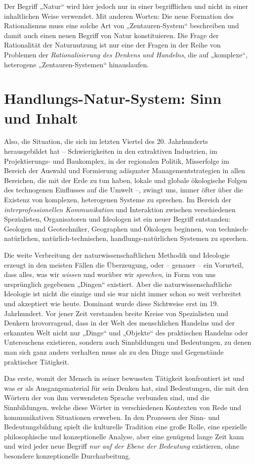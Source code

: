 \documentclass[11pt,a4paper]{article}
\begin{document}
Der Begriff „Natur“ wird hier jedoch nur in einer begriff\-lichen und nicht in
einer inhaltlichen Weise verwendet. Mit anderen Worten: Die neue Formation des
Rationalismus muss eine solche Art von „Zentauren-System“ beschreiben und
damit auch einen neuen Begriff von Natur konstituieren. Die Frage der
Rationalität der Naturnutzung ist nur eine der Fragen in der Reihe von
Problemen der \emph{Rationalisierung des Denkens und Handelns}, die auf
„komplexe“, heterogene „Zentauren-Systemen“ hinauslaufen.

\section{Handlungs-Natur-System: Sinn und Inhalt}

Also, die Situation, die sich im letzten Viertel des 20. Jahrhunderts
herausgebildet hat -- Schwierigkeiten in den extraktiven Industrien, im
Projektierungs- und Baukomplex, in der regionalen Politik, Misserfolge im
Bereich der Auswahl und Formierung adäquater Managementstrategien in allen
Bereichen, die mit der Erde zu tun haben, lokale und globale ökologische
Folgen des technogenen Einflusses auf die Umwelt --, zwingt uns, immer öfter
über die Existenz von komplexen, heterogenen Systeme zu sprechen.  Im Bereich
der \emph{interprofessionellen Kommunikation} und Interaktion zwischen
verschiedenen Spezialisten, Organisatoren und Ideologen ist ein neuer Begriff
entstanden: Geologen und Geotechniker, Geographen und Ökologen beginnen, von
technisch-natürlichen, natürlich-technischen, handlungs-natürlichen Systemen
zu sprechen.

Die weite Verbreitung der naturwissenschaftlichen Methodik und Ideologie
erzeugt in den meisten Fällen die Überzeugung, oder -- genauer -- ein
Vorurteil, dass alles, was wir \emph{wissen} und worüber wir \emph{sprechen},
in Form von uns ursprünglich gegebenen „Dingen“ existiert.  Aber die
naturwissenschaftliche Ideologie ist nicht die einzige und sie war nicht immer
schon so weit verbreitet und akzeptiert wie heute. Dominant wurde diese
Sichtweise erst im 19. Jahrhundert. Vor jener Zeit verstanden breite Kreise
von Spezialisten und Denkern hrovorragend, dass in der Welt des menschlichen
Handelns und der erkannten Welt nicht nur „Dinge“ und „Objekte“ des
praktischen Handelns oder Untersuchens existieren, sondern auch Sinnbildungen
und Bedeutungen, zu denen man sich ganz anders verhalten muss als zu den Dinge
und Gegenstände praktischer Tätigkeit.

Das erste, womit der Mensch in seiner bewussten Tätigkeit konfrontiert ist und
was er als Ausgangsmaterial für sein Denken hat, sind Bedeutungen, die mit den
Wörtern der von ihm verwendeten Sprache verbunden sind, und die Sinnbildungen,
welche diese Wörter in verschiedenen Kontexten von Rede und kommunikativen
Situationen erwerben. In den Prozessen der Sinn- und Bedeutungsbildung spielt
die kulturelle Tradition eine große Rolle, eine spezielle philosophische und
konzeptionelle Analyse, aber eine genügend lange Zeit kann und wird jeder neue
Begriff \emph{nur auf der Ebene der Bedeutung} existieren, ohne besondere
konzeptionelle Durcharbeitung.
\end{document}
